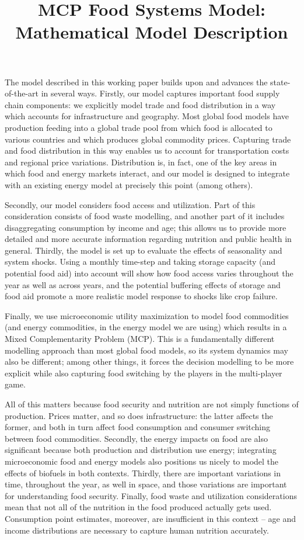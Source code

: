 \documentclass[letter,12pt]{article}
\begin{document}
\title{MCP Food Systems Model: Mathematical Model Description}
\author{}
\date{}

\maketitle

The model described in this working paper builds upon and advances the state-of-the-art in several ways.  Firstly, our model captures important food supply chain components: we explicitly model trade and food distribution in a way which accounts for infrastructure and geography.  Most global food models have production feeding into a global trade pool from which food is allocated to various countries and which produces global commodity prices.  Capturing trade and food distribution in this way enables us to account for transportation costs and regional price variations.  Distribution is, in fact, one of the key areas in which food and energy markets interact, and our model is designed to integrate with an existing energy model at precisely this point (among others).

Secondly, our model considers food access and utilization.  Part of this consideration consists of food waste modelling, and another part of it includes disaggregating consumption by income and age; this allows us to provide more detailed and more accurate information regarding nutrition and public health in general.  Thirdly, the model is set up to evaluate the effects of seasonality and system shocks.  Using a monthly time-step and taking storage capacity (and potential food aid) into account will show how food access varies throughout the year as well as across years, and the potential buffering effects of storage and food aid promote a more realistic model response to shocks like crop failure.

Finally, we use microeconomic utility maximization to model food commodities (and energy commodities, in the energy model we are using) which results in a Mixed Complementarity Problem (MCP).  This is a fundamentally different modelling approach than most global food models, so its system dynamics may also be different; among other things, it forces the decision modelling to be more explicit while also capturing food switching by the players in the multi-player game.

All of this matters because food security and nutrition are not simply functions of production.  Prices matter, and so does infrastructure: the latter affects the former, and both in turn affect food consumption and consumer switching between food commodities.  Secondly, the energy impacts on food are also significant because both production and distribution use energy; integrating microeconomic food and energy models also positions us nicely to model the effects of biofuels in both contexts.  Thirdly, there are important variations in time, throughout the year, as well in space, and those variations are important for understanding food security.  Finally, food waste and utilization considerations mean that not all of the nutrition in the food produced actually gets used.  Consumption point estimates, moreover, are insufficient in this context -- age and income distributions are necessary to capture human nutrition accurately.
\end{document}
